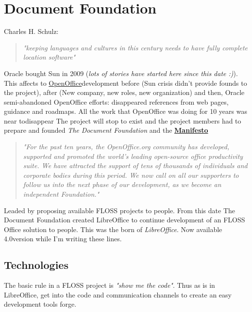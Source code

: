 \section{Document Foundation}
\label{sec:document-foundation}

Charles H. Schulz:

\begin{quote}
    \textit{"keeping languages and cultures in this century needs to have fully complete location software"}
\end{quote}

Oracle bought Sun in 2009 (\textit{lots of stories have started here since this date :)}). This affects to \href{http://www.openoffice.org/}{OpenOffice}development before (Sun crisis didn't provide founds to the project), after (New company, new roles, new organization) and then, Oracle semi-abandoned OpenOffice efforts: disappeared references from web pages, guidance and roadmaps. All the work that OpenOffice was doing for 10 years was near todisappear The project will stop to exist and the project members had to prepare and founded \textit{The Document Foundation} and the \textbf{\href{http://www.documentfoundation.org/foundation}{Manifesto}}

\begin{quote}
    \textit{"For the past ten years, the OpenOffice.org community has developed, supported and promoted the world's leading open-source office productivity suite. We have attracted the support of tens of thousands of individuals and corporate bodies during this period. We now call on all our supporters to follow us into the next phase of our development, as we become an independent Foundation."}
\end{quote}

\par Leaded by proposing available FLOSS projects to people. From this date The Document Foundation created LibreOffice to continue development of an FLOSS Office solution to people. This was the born of \textit{LibreOffice}. Now available 4.0version while I'm writing these lines.

\subsection{Technologies}

\par The basic rule in a FLOSS project is \textit{"show me the code"}. Thus as is in LibreOffice, get into the code and communication channels to create an easy development tools forge.

